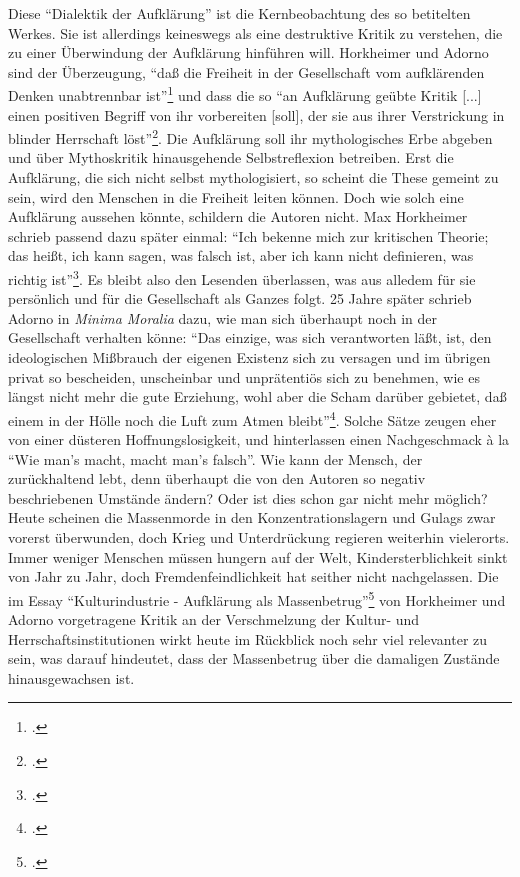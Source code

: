 \documentclass[a4paper, 12pt]{article}
\begin{document}
\begin{onehalfspace}
Diese "`Dialektik der Aufklärung"' ist die Kernbeobachtung des so betitelten Werkes. Sie ist allerdings keineswegs als eine destruktive Kritik zu verstehen, die zu einer Überwindung der Aufklärung hinführen will. Horkheimer und Adorno sind der Ü\-ber\-zeu\-gung, "`daß die Freiheit in der Gesellschaft vom aufklärenden Denken unabtrennbar ist"'\footnote{\Cite[Siehe][S. 3]{dialektik-der-aufklaerung}.} und dass die so "`an Aufklärung geübte Kritik [...] einen positiven Begriff von ihr vorbereiten [soll], der sie aus ihrer Verstrickung in blinder Herrschaft löst"'\footnote{\Cite[Siehe][S. 6]{dialektik-der-aufklaerung}.}. Die Aufklärung soll ihr mythologisches Erbe abgeben und über Mythoskritik hinausgehende Selbstreflexion betreiben. Erst die Aufklärung, die sich nicht selbst mythologisiert, so scheint die These gemeint zu sein, wird den Menschen in die Freiheit leiten können. Doch wie solch eine Aufklärung aussehen könnte, schildern die Autoren nicht. Max Horkheimer schrieb passend dazu später einmal: "`Ich bekenne mich zur kritischen Theorie; das heißt, ich kann sagen, was falsch ist, aber ich kann nicht definieren, was richtig ist"'\footnote{\Cite[Siehe][S. 150]{gesellschaft}.}. Es bleibt also den Lesenden überlassen, was aus alledem für sie persönlich und für die Gesellschaft als Ganzes folgt. 25 Jahre später schrieb Adorno in \emph{Minima Moralia} dazu, wie man sich überhaupt noch in der Gesellschaft verhalten könne: "`Das einzige, was sich verantworten läßt, ist, den ideologischen Mißbrauch der eigenen Existenz sich zu versagen und im übrigen privat so bescheiden, unscheinbar und unprätentiös sich zu benehmen, wie es längst nicht mehr die gute Erziehung, wohl aber die Scham darüber gebietet, daß einem in der Hölle noch die Luft zum Atmen bleibt"'\footnote{\Cite[Siehe][S. 24]{minima}.}. Solche Sätze zeugen eher von einer düsteren Hoffnungslosigkeit, und hinterlassen einen Nachgeschmack \`{a} la "`Wie man's macht, macht man's falsch"'. Wie kann der Mensch, der zurückhaltend lebt, denn überhaupt die von den Autoren so negativ beschriebenen Umstände ändern? Oder ist dies schon gar nicht mehr möglich? Heute scheinen die Massenmorde in den Konzentrationslagern und Gulags zwar vorerst überwunden, doch Krieg und Unterdrückung regieren weiterhin vielerorts. Immer weniger Menschen müssen hungern auf der Welt, Kindersterblichkeit sinkt von Jahr zu Jahr, doch Fremdenfeindlichkeit hat seither nicht nachgelassen. Die im Essay "`Kulturindustrie - Aufklärung als Massenbetrug"'\footnote{\Cite[Siehe][S. 128--176]{dialektik-der-aufklaerung}.} von Horkheimer und Adorno vorgetragene Kritik an der Verschmelzung der Kultur- und Herrschaftsinstitutionen wirkt heute im Rückblick noch sehr viel relevanter zu sein, was darauf hindeutet, dass der Massenbetrug über die damaligen Zustände hinausgewachsen ist.


\end{onehalfspace}
\end{document}
